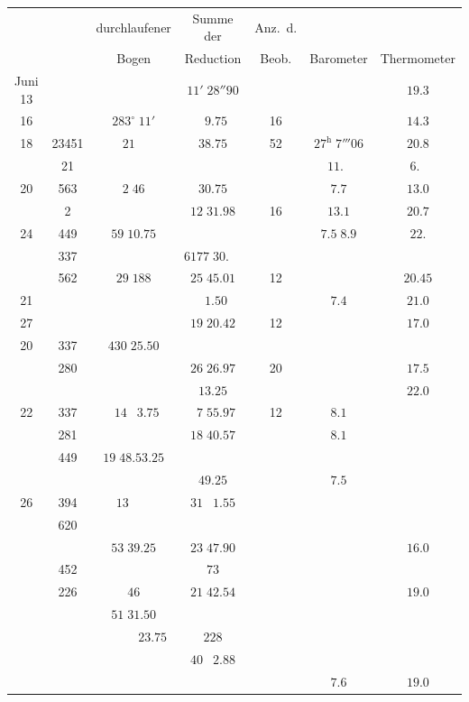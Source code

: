 \documentclass[12pt,a4paper]{article}
\begin{document}
\begin{center}
\small
\begin{tabular}{c|c|c|c|c|c|c}
\toprule
& & durchlaufener & Summe der & Anz.~d. & & \\
& & Bogen & Reduction & Beob. & Barometer & Thermometer \\
\midrule
Juni 13 & & & $11'\;28''90$ & & & $19.3$ \\
\phantom{13} 16 & & $283^{\circ}\;11'$ & $\phantom{0}9.75$ & 16 & & $14.3$ \\
\phantom{13} 18 & 23451 & $\phantom{0}21\;\phantom{0}\phantom{0}$ & $38.75$ & 52 & $27^{\mathrm{h}}\;7'''06$ & $20.8$ \\
& 21 & & & & $11.\phantom{0}$ & $6.\phantom{0}$ \\
\phantom{13} 20 & 563 & $2\;46$ & $30.75$ & & $7.7$ & $13.0$ \\
& 2 & & $12\;31.98$ & 16 & $13.1$ & $20.7$ \\
\phantom{13} 24 & 449 & $59\;10.75$ & & & $7.5\;8.9$ & $22.$ \\
& 337 & & $6177\;30.\phantom{00}$ & & & \\
& 562 & $29\;188$ & $25\;45.01$ & 12 & & $20.45$ \\
\phantom{13} 21 & & & $\phantom{0}1.50$ & & $7.4$ & $21.0$ \\
\phantom{13} 27 & & & $19\;20.42$ & 12 & & $17.0$ \\
\phantom{13} 20 & 337 & $430\;25.50$ & & & & \\
& 280 & & $26\;26.97$ & 20 & & $17.5$ \\
& & & $13.25$ & & & $22.0$ \\
\phantom{13} 22 & 337 & $\phantom{0}14\;\phantom{0}3.75$ & $\phantom{0}7\;55.97$ & 12 & $8.1$ & \\
& 281 & & $18\;40.57$ & & $8.1$ & \\
& 449 & $19\;48.53.25$ & & & & \\
& & & $49.25$ & & $7.5$ & \\
\phantom{13} 26 & 394 & $\phantom{0}13\;\phantom{0}\phantom{0}\phantom{0}\phantom{0}$ & $31\;\phantom{0}1.55$ & & & \\
& 620 & & & & & \\
& & $53\;39.25$ & $23\;47.90$ & & & $16.0$ \\
& 452 & & $73$ & & & \\
& 226 & $46$ & $21\;42.54$ & & & $19.0$ \\
& & $51\;31.50$ & & & & \\
& & $\phantom{0}\phantom{0}\phantom{0}\phantom{0}\phantom{0}\phantom{0}23.75$ & $228$ & & & \\
& & & $40\;\phantom{0}2.88$ & & & \\
& & & & & $7.6$ & $19.0$ \\
\bottomrule
\end{tabular}
\end{center}
\end{document}

